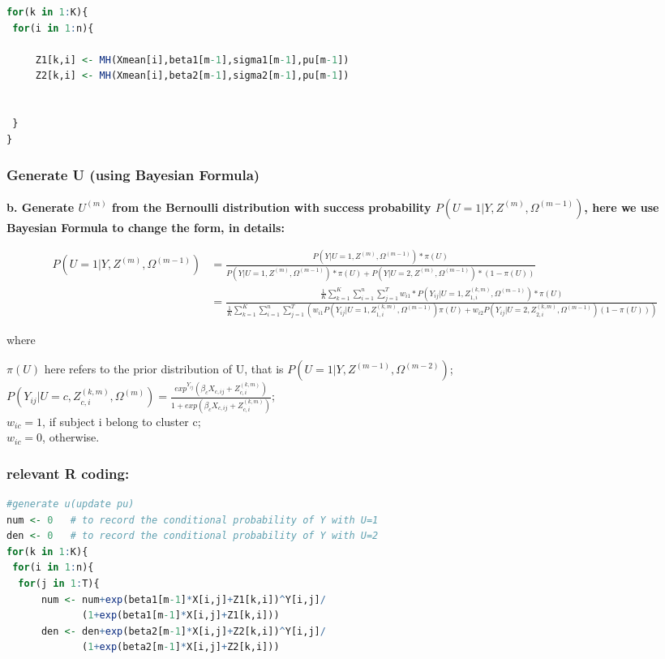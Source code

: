 \documentclass[10pt]{article}
\begin{document}
\begin{CJK}{UTF8}{gbsn}
\begin{lstlisting}[language=R]
for(k in 1:K){
 for(i in 1:n){

     Z1[k,i] <- MH(Xmean[i],beta1[m-1],sigma1[m-1],pu[m-1])
     Z2[k,i] <- MH(Xmean[i],beta2[m-1],sigma2[m-1],pu[m-1])
  
   
 }
}

\end{lstlisting}
\subsubsection{Generate U (using Bayesian Formula)}
\hspace*{1cm}\textbf{b. Generate $U^{(m)}$ from the Bernoulli distribution with success probability $P(U=1|Y,Z^{(m)},\Omega^{(m-1)})$, here we use Bayesian Formula to change the form, in details:}
\begin{small}
\begin{equation}
\begin{split}
P(U=1|Y,Z^{(m)},\Omega^{(m-1)})&=\frac{P(Y|U=1,Z^{(m)},\Omega^{(m-1)})*\pi(U)}{P(Y|U=1,Z^{(m)},\Omega^{(m-1)})*\pi(U)+P(Y|U=2,Z^{(m)},\Omega^{(m-1)})*(1-\pi(U))}
\\&=\frac{\frac{1}{K}\sum_{k=1}^K\sum_{i=1}^n\sum_{j=1}^Tw_{i1}*P(Y_{ij}|U=1,Z_{1,i}^{(k,m)},\Omega^{(m-1)})*\pi(U)}{\frac{1}{K}\sum_{k=1}^K\sum_{i=1}^n\sum_{j=1}^T(w_{i1}P(Y_{ij}|U=1,Z_{1,i}^{(k,m)},\Omega^{(m-1)})\pi(U)+w_{i2}P(Y_{ij}|U=2,Z_{2,i}^{(k,m)},\Omega^{(m-1)})(1-\pi(U)))}
\end{split}
\end{equation}
\end{small}
where
\begin{flushleft}
$\pi(U)$ here refers to the prior distribution of U, that is $P(U=1|Y,Z^{(m-1)},\Omega^{(m-2)})$;
\\$P(Y_{ij}|U=c,Z_{c,i}^{(k,m)},\Omega^{(m)})=\frac{exp^{Y_{ij}}(\beta_cX_{c,ij}+Z^{(k,m)}_{c,i})}{1+exp(\beta_cX_{c,ij}+Z^{(k,m)}_{c,i})}$;
\\$w_{ic}=1$, if subject i belong to cluster c;
\\$w_{ic}=0$, otherwise.
\end{flushleft}
\bigskip
\subsubsection*{relevant R coding:}
\begin{lstlisting}[language=R]
#generate u(update pu)
num <- 0   # to record the conditional probability of Y with U=1
den <- 0   # to record the conditional probability of Y with U=2
for(k in 1:K){
 for(i in 1:n){
  for(j in 1:T){
      num <- num+exp(beta1[m-1]*X[i,j]+Z1[k,i])^Y[i,j]/
             (1+exp(beta1[m-1]*X[i,j]+Z1[k,i]))
      den <- den+exp(beta2[m-1]*X[i,j]+Z2[k,i])^Y[i,j]/
             (1+exp(beta2[m-1]*X[i,j]+Z2[k,i]))


\end{lstlisting}
\end{CJK}
\end{document}
